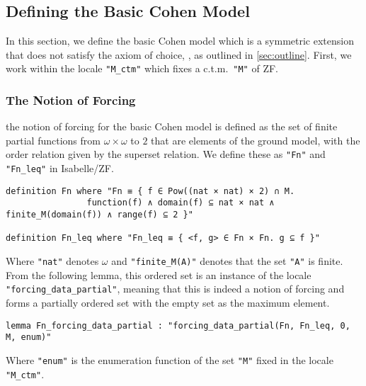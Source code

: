 \documentclass{report}
\newenvironment{isaframe}{\begin{mdframed}[topline=false, rightline=false, bottomline=false]}{\end{mdframed}}
\begin{document}
\subsection{Defining the Basic Cohen Model}
In this section, we define the basic Cohen model which is a symmetric extension that does not satisfy the axiom of choice,
, as outlined in \cref{sec:outline}.
First, we work within the locale \texttt{"M\_ctm"} which fixes a c.t.m.\  \texttt{"M"} of ZF.


\subsubsection{The Notion of Forcing}
the notion of forcing for the basic Cohen model is defined as the set of finite partial functions from $\omega \times \omega$ to $2$ that are elements of the ground model,
with the order relation given by the superset relation.
We define these as \texttt{"Fn"} and \texttt{"Fn\_leq"} in Isabelle/ZF.

\begin{isaframe}
\begin{verbatim}
definition Fn where "Fn ≡ { f ∈ Pow((nat × nat) × 2) ∩ M. 
                function(f) ∧ domain(f) ⊆ nat × nat ∧ finite_M(domain(f)) ∧ range(f) ⊆ 2 }"

definition Fn_leq where "Fn_leq ≡ { <f, g> ∈ Fn × Fn. g ⊆ f }" 
\end{verbatim}
\end{isaframe}
Where \texttt{"nat"} denotes $\omega$ and \texttt{"finite\_M(A)"} denotes that the set \texttt{"A"} is finite.
From the following lemma, this ordered set is an instance of the locale \texttt{"forcing\_data\_partial"}, 
meaning that this is indeed a notion of forcing and forms a partially ordered set with the empty set as the maximum element.
\begin{isaframe}
\begin{verbatim}
lemma Fn_forcing_data_partial : "forcing_data_partial(Fn, Fn_leq, 0, M, enum)" 
\end{verbatim}
\end{isaframe}
Where \texttt{"enum"} is the enumeration function of the set \texttt{"M"} fixed in the locale \texttt{"M\_ctm"}.
\end{document}
